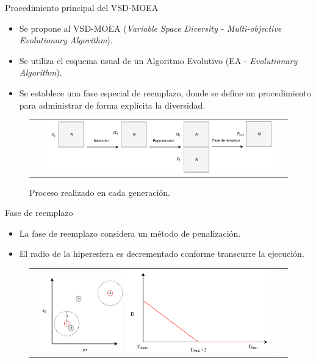 \documentclass{beamer}
\begin{document}
\begin{frame}{Procedimiento principal del VSD-MOEA}
\begin{itemize}
\justifying
\item Se propone al VSD-MOEA (\textit{Variable Space Diversity - Multi-objective Evolutionary Algorithm}).
\justifying
\item Se utiliza el esquema usual de un Algoritmo Evolutivo (EA - \textit{Evolutionary Algorithm}).
\justifying
\item Se establece una fase especial de reemplazo, donde se define un procedimiento para administrar de forma explícita la diversidad.
\end{itemize}
\begin{figure}
\centering
\begin{tabular}{c}
\includegraphics[width=0.9\textwidth]{Evolution_Process.pdf}
\end{tabular}
\caption{Proceso realizado en cada generación.}
\label{fig:DiversityProposal}
\end{figure}
\end{frame}


\begin{frame}{Fase de reemplazo}
\begin{itemize}
\justifying
\item La fase de reemplazo considera un método de penalización.
\justifying
\item El radio de la hiperesfera es decrementado conforme transcurre la ejecución.
\end{itemize}
\begin{figure}
\centering
\begin{tabular}{cc}
\includegraphics[width=0.35\textwidth]{Metodo_Penalizacion.pdf} \quad \quad \quad
\includegraphics[width=0.6\textwidth]{Modelo.pdf}
\end{tabular}
\label{fig:DiversityProposal}
\end{figure}
\end{frame}
\end{document}
